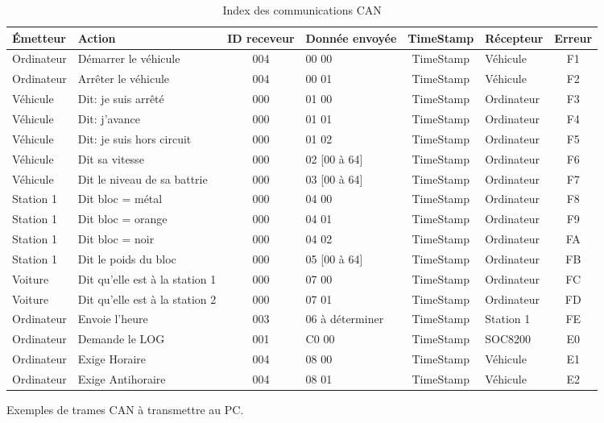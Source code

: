 \documentclass[10pt,a4paper,final]{article}
\begin{document}
\begin{spacing}{1.5}
\begin{table}[!ht]
\caption{Index des communications CAN}
\medskip
\centering
\begin{tabular}{|l|l|c|l|c|l|c|}
\hline 
\textbf{Émetteur} & \textbf{Action} & \textbf{ID receveur} & \textbf{Donnée envoyée} & \textbf{TimeStamp} & \textbf{Récepteur} & \textbf{Erreur}\\ 
\hline 
Ordinateur & Démarrer le véhicule & 004 & 00 00 & TimeStamp & Véhicule &  F1\\ 
\hline 
Ordinateur & Arrêter le véhicule & 004 & 00 01 & TimeStamp & Véhicule &  F2\\ 
\hline 
Véhicule & Dit: je suis arrêté & 000 & 01 00  & TimeStamp & Ordinateur &  F3\\
\hline 
Véhicule & Dit: j'avance & 000 & 01 01 & TimeStamp & Ordinateur  &  F4\\  
\hline 
Véhicule & Dit: je suis hors circuit & 000 & 01 02 & TimeStamp & Ordinateur &  F5\\ 
\hline 
Véhicule & Dit sa vitesse & 000 & 02 [00 à 64] & TimeStamp & Ordinateur &  F6\\ 
\hline 
Véhicule & Dit le niveau de sa battrie & 000 & 03 [00 à 64] & TimeStamp & Ordinateur &  F7\\ 
\hline 
Station 1 & Dit bloc = métal & 000 & 04 00 & TimeStamp & Ordinateur &  F8\\ 
\hline  
Station 1 & Dit bloc = orange & 000 & 04 01 & TimeStamp & Ordinateur &  F9\\
\hline 
Station 1 & Dit bloc = noir & 000 & 04 02 & TimeStamp & Ordinateur &  FA\\
\hline 
Station 1 & Dit le poids du bloc & 000 & 05 [00 à 64] & TimeStamp & Ordinateur &  FB\\ 
\hline 
Voiture & Dit qu'elle est à la station 1 & 000 & 07 00 & TimeStamp & Ordinateur &  FC\\ 
\hline 
Voiture & Dit qu'elle est à la station 2 & 000 & 07 01 & TimeStamp & Ordinateur &  FD\\
\hline 
Ordinateur & Envoie l'heure & 003 & 06 à déterminer & TimeStamp & Station 1 &  FE\\ 
\hline 
Ordinateur & Demande le LOG & 001 & C0 00 & TimeStamp & SOC8200 & E0\\ 
\hline
Ordinateur & Exige Horaire & 004 & 08 00 & TimeStamp & Véhicule & E1\\ 
\hline
Ordinateur & Exige Antihoraire & 004 & 08 01 & TimeStamp & Véhicule & E2\\ 
\hline
\end{tabular} 
\label{tab:testtab1}
\end{table}

\pagebreak
\begin{flushleft}
 Exemples de trames CAN à transmettre au PC.
 \end{flushleft} 
\end{spacing}
\end{document}
